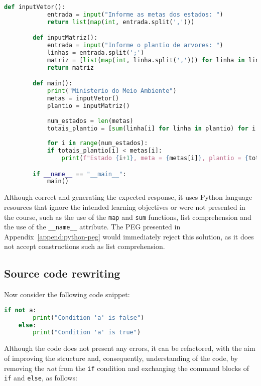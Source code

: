 \begin{itemize}
    \begin{lstlisting}[language=Python, breaklines]
        def inputVetor():
            entrada = input("Informe as metas dos estados: ")
            return list(map(int, entrada.split(',')))

        def inputMatriz():
            entrada = input("Informe o plantio de arvores: ")
            linhas = entrada.split(';')
            matriz = [list(map(int, linha.split(','))) for linha in linhas]
            return matriz

        def main():
            print("Ministerio do Meio Ambiente")
            metas = inputVetor()
            plantio = inputMatriz()
            
            num_estados = len(metas)
            totais_plantio = [sum(linha[i] for linha in plantio) for i in range(num_estados)]
            
            for i in range(num_estados):
            if totais_plantio[i] < metas[i]:
                print(f"Estado {i+1}, meta = {metas[i]}, plantio = {totais_plantio[i]}")

        if __name__ == "__main__":
            main()
    \end{lstlisting}

    Although correct and generating the expected response, it uses Python language 
    resources that ignore the intended learning objectives or were not presented 
    in the course, such as the use of the \texttt{map} and \texttt{sum} functions, 
    list comprehension and the use of the \texttt{\_\_name\_\_} attribute.
    The PEG presented in Appendix~\ref{append:python-peg} would immediately reject 
    this solution, as it does not accept constructions such as list comprehension.
\end{itemize}


\subsection{Source code rewriting}

Now consider the following code snippet:

\begin{lstlisting}[language=Python]
    if not a:
        print("Condition 'a' is false")
    else:
        print("Condition 'a' is true")
\end{lstlisting}

Although the code does not present any errors, it can be refactored, with the 
aim of improving the structure and, consequently, understanding of the code, by 
removing the \textit{not} from the \texttt{if} condition and exchanging the 
command blocks of \texttt{if} and \texttt{else}, as follows:

